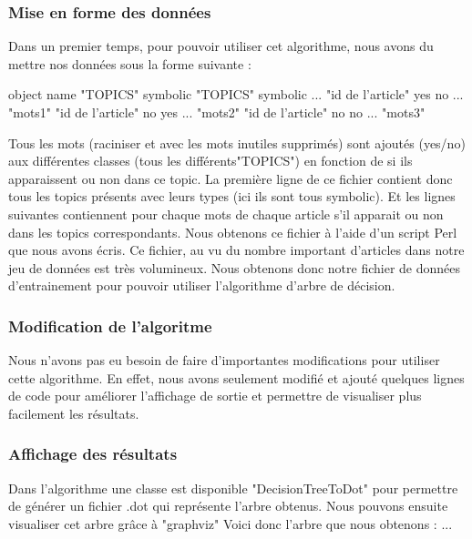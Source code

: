 \subsubsection{Mise en forme des données}  
Dans un premier temps, pour pouvoir utiliser cet algorithme, nous avons du mettre nos données sous la forme suivante :

object name "TOPICS" symbolic "TOPICS" symbolic ...
"id de l'article" yes no ... "mots1"
"id de l'article" no yes ... "mots2"
"id de l'article" no no ... "mots3"

Tous les mots (raciniser et avec les mots inutiles supprimés) sont ajoutés (yes/no) aux différentes classes (tous les différents"TOPICS") en fonction de si ils apparaissent ou non dans ce topic.
La première ligne de ce fichier contient donc tous les topics présents avec leurs types (ici ils sont tous symbolic). Et les lignes suivantes contiennent pour chaque mots de chaque article s'il apparait ou non dans les topics correspondants.
Nous obtenons ce fichier à l'aide d'un script Perl que nous avons écris. Ce fichier, au vu du nombre important d'articles dans notre jeu de données est très volumineux. Nous obtenons donc notre fichier de données d'entrainement pour pouvoir utiliser l'algorithme d'arbre de décision.

\subsubsection{Modification de l'algoritme}  
Nous n'avons pas eu besoin de faire d'importantes modifications pour utiliser cette algorithme. En effet, nous avons seulement modifié et ajouté quelques lignes de code pour améliorer l'affichage de sortie et permettre de visualiser plus facilement les résultats.

\subsubsection{Affichage des résultats}
Dans l'algorithme une classe est disponible "DecisionTreeToDot" pour permettre de générer un fichier .dot qui représente l'arbre obtenus. Nous pouvons ensuite visualiser cet arbre grâce à "graphviz"
Voici donc l'arbre que nous obtenons :
...

